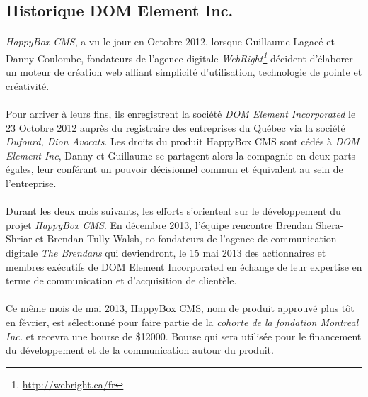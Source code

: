 \documentclass[11pt, a4paper ]{article}
\begin{document}
\begin{spacing}{1.5}
		\subsection{Historique DOM Element Inc.}

\paragraph{}
\emph{HappyBox CMS}, a vu le jour en Octobre 2012, lorsque Guillaume Lagacé et Danny Coulombe, fondateurs de l'agence digitale \emph{WebRight\footnote{\url{http://webright.ca/fr}}} décident d'élaborer un moteur de création web alliant simplicité d'utilisation, technologie de pointe et créativité.

\paragraph{}
Pour arriver à leurs fins, ils enregistrent la société \emph{DOM Element Incorporated} le 23 Octobre 2012 auprès du registraire des entreprises du Québec via la société \emph{Dufourd, Dion Avocats}. Les droits du produit HappyBox CMS sont cédés à \emph{DOM Element Inc}, Danny et Guillaume se partagent alors la compagnie en deux parts égales, leur conférant un pouvoir décisionnel commun et équivalent au sein de l'entreprise.

\paragraph{}
Durant les deux mois suivants, les efforts s'orientent sur le développement du projet \emph{HappyBox CMS}.
En décembre 2013, l'équipe rencontre Brendan Shera-Shriar et Brendan Tully-Walsh, co-fondateurs de l'agence de communication digitale \emph{The Brendans} qui deviendront, le 15 mai 2013 des actionnaires et membres exécutifs de DOM Element Incorporated en échange de leur expertise en terme de communication et d'acquisition de clientèle.


\paragraph{}
Ce même mois de mai 2013, HappyBox CMS, nom de produit approuvé plus tôt en février, est sélectionné pour faire partie de la \emph{cohorte de la fondation Montreal Inc.} et recevra une bourse de \$12000. Bourse qui sera utilisée pour le financement du développement et de la communication autour du produit.


\end{spacing}
\end{document}
